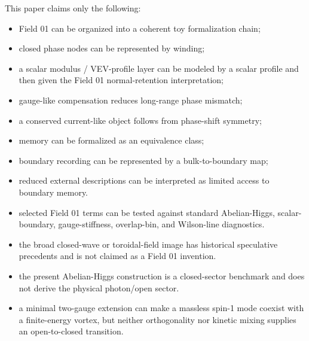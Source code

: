 \documentclass[11pt,a4paper]{article}
\begin{document}
This paper claims only the following:
\begin{itemize}
\item Field 01 can be organized into a coherent toy formalization chain;
\item closed phase nodes can be represented by winding;
\item a scalar modulus / VEV-profile layer can be modeled by a scalar profile and then given the Field 01 normal-retention interpretation;
\item gauge-like compensation reduces long-range phase mismatch;
\item a conserved current-like object follows from phase-shift symmetry;
\item memory can be formalized as an equivalence class;
\item boundary recording can be represented by a bulk-to-boundary map;
\item reduced external descriptions can be interpreted as limited access to boundary memory.
\item selected Field 01 terms can be tested against standard Abelian-Higgs, scalar-boundary, gauge-stiffness, overlap-bin, and Wilson-line diagnostics.
\item the broad closed-wave or toroidal-field image has historical speculative precedents and is not claimed as a Field 01 invention.
\item the present Abelian-Higgs construction is a closed-sector benchmark and does not derive the physical photon/open sector.
\item a minimal two-gauge extension can make a massless spin-1 mode coexist with a finite-energy vortex, but neither orthogonality nor kinetic mixing supplies an open-to-closed transition.
\end{itemize}
\end{document}
